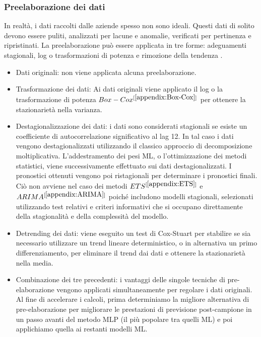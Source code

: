 \documentclass[12pt,a4paper]{report}
\begin{document}
\subsubsection{Preelaborazione dei dati}
In realtà, i dati raccolti dalle aziende spesso non sono ideali. Questi dati di solito devono essere puliti, analizzati per lacune e anomalie, verificati per pertinenza e ripristinati.
La preelaborazione può essere applicata in tre forme: adeguamenti stagionali, log o trasformazioni di potenza e rimozione della tendenza \cite{makridakis2018statistical}.
\begin{itemize}
    \item Dati originali: non viene applicata alcuna preelaborazione.
    \item Trasformazione dei dati: Ai dati originali viene applicato il log o la trasformazione di potenza $Box-Cox^{[\ref{appendix:Box-Cox}]}$ per ottenere la stazionarietà nella varianza.
    \item Destagionalizzazione dei dati: i dati sono considerati stagionali se esiste un coefficiente di autocorrelazione significativo al lag 12. In tal caso i dati vengono destagionalizzati utilizzando il classico approccio di decomposizione moltiplicativa. L'addestramento dei pesi ML, o l'ottimizzazione dei metodi statistici, viene successivamente effettuato sui dati destagionalizzati. I pronostici ottenuti vengono poi ristagionali per determinare i pronostici finali. Ciò non avviene nel caso dei metodi $ETS^{[\ref{appendix:ETS}]}$ e $ARIMA^{[\ref{appendix:ARIMA}]}$ poiché includono modelli stagionali, selezionati utilizzando test relativi e criteri informativi che si occupano direttamente della stagionalità e della complessità del modello.
    \item Detrending dei dati: viene eseguito un test di Cox-Stuart per stabilire se sia necessario utilizzare un trend lineare deterministico, o in alternativa un primo differenziamento, per eliminare il trend dai dati e ottenere la stazionarietà nella media.
    \item Combinazione dei tre precedenti: i vantaggi delle singole tecniche di pre-elaborazione vengono applicati simultaneamente per regolare i dati originali. Al fine di accelerare i calcoli, prima determiniamo la migliore alternativa di pre-elaborazione per migliorare le prestazioni di previsione post-campione in un passo avanti del metodo MLP (il più popolare tra quelli ML) e poi applichiamo quella ai restanti modelli ML.
\end{itemize}
\end{document}
